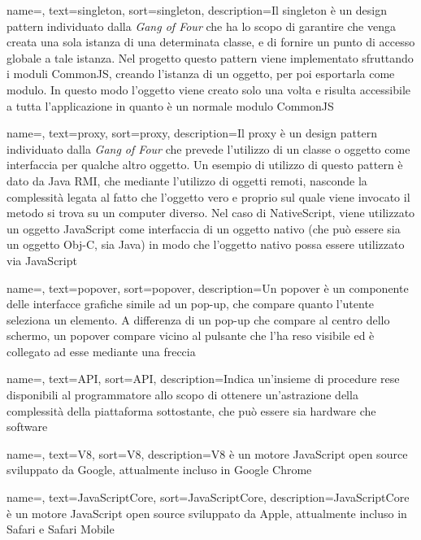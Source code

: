 {
    name=,
    text=singleton,
    sort=singleton,
    description={Il singleton è un design pattern individuato dalla \textit{Gang of Four} che ha lo scopo di garantire che venga creata una sola istanza di una determinata classe, e di fornire un punto di accesso globale a tale istanza.
     Nel progetto questo pattern viene implementato sfruttando i moduli CommonJS, creando l'istanza di un oggetto, per poi esportarla come modulo. In questo modo l'oggetto viene creato solo una volta e risulta accessibile a tutta l'applicazione in quanto è un normale modulo CommonJS}
}

{
    name=,
    text=proxy,
    sort=proxy,
    description={Il proxy è un design pattern individuato dalla \textit{Gang of Four} che prevede l'utilizzo di un classe o oggetto come interfaccia per qualche altro oggetto. Un esempio di utilizzo di questo pattern è dato da Java RMI, che mediante l'utilizzo di oggetti remoti, nasconde la complessità legata al fatto che l'oggetto vero e proprio sul quale viene invocato il metodo si trova su un computer diverso. Nel caso di NativeScript, viene utilizzato un oggetto JavaScript come interfaccia di un oggetto nativo (che può essere sia un oggetto Obj-C, sia Java) in modo che l'oggetto nativo possa essere utilizzato via JavaScript}
}


{
    name=,
    text=popover,
    sort=popover,
    description={Un popover è un componente delle interfacce grafiche simile ad un pop-up, che compare quanto l'utente seleziona un elemento. A differenza di un pop-up che compare al centro dello schermo, un popover compare vicino al pulsante che l'ha reso visibile ed è collegato ad esse mediante una freccia}
}

{
    name=,
    text=API,
    sort=API,
    description={Indica un'insieme di procedure rese disponibili al programmatore allo scopo di ottenere un'astrazione della complessità della piattaforma sottostante, che può essere sia hardware che software}
}

{
    name=,
    text=V8,
    sort=V8,
    description={V8 è un motore JavaScript open source sviluppato da Google, attualmente incluso in Google Chrome}
}

{
    name=,
    text=JavaScriptCore,
    sort=JavaScriptCore,
    description={JavaScriptCore è un motore JavaScript open source sviluppato da Apple, attualmente incluso in Safari e Safari Mobile}
}

